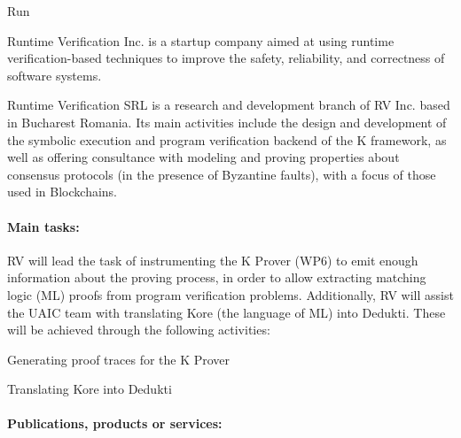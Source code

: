 \begin{sitedescription}{Run}



Runtime Verification Inc. is a startup company aimed at using runtime verification-based
techniques to improve the safety, reliability, and correctness of software systems.

Runtime Verification SRL is a research and development branch of RV Inc. based
in Bucharest Romania.  Its main activities include the design and development of
the symbolic execution and program verification backend of the K framework,
as well as offering consultance with modeling and proving properties about
consensus protocols (in the presence of Byzantine faults),
with a focus of those used in Blockchains.

\paragraph*{Main tasks:}


RV will lead the task of instrumenting the K Prover (WP6) to emit enough information
about the proving process, in order to allow extracting matching logic (ML) proofs from
program verification problems.  Additionally, RV will assist the UAIC team with
translating Kore (the language of ML) into Dedukti.
These will be achieved through the following activities:


\begin{compactitem}
\item Generating proof traces for the K Prover
\item Translating Kore into Dedukti 
\end{compactitem}

\paragraph*{Publications, products or services:}



\end{sitedescription}
